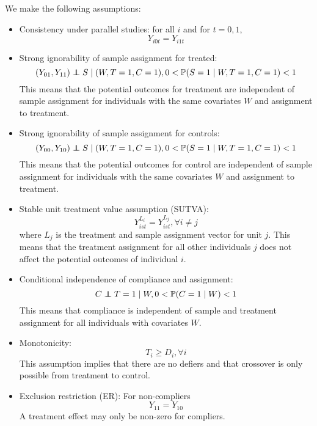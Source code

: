 \documentclass{article}
\newcommand{\pr}{\mathbb{P}} %
\newcommand\independent{\protect\mathpalette{\protect\independenT}{\perp}}
\def\independenT#1#2{\mathrel{\rlap{$#1#2$}\mkern2mu{#1#2}}}
\theoremstyle{plain}
\begin{document}
We make the following assumptions:
\begin{itemize}
\item{Consistency under parallel studies: for all $i$ and for $t=0, 1$,
\begin{equation}\label{consistency}
Y_{i0t} = Y_{i1t}
\end{equation}}
\item{Strong ignorability of sample assignment for treated:
\begin{equation}\label{si_treat}
(Y_{01}, Y_{11}) \independent S \mid (W, T=1,C = 1), 0 < \pr(S=1 \mid W, T=1,C = 1) <1 
\end{equation}}
This means that the potential outcomes for treatment are independent of sample assignment for individuals with the same covariates $W$ and assignment to treatment.
\item{Strong ignorability of sample assignment for controls:
\begin{equation}\label{si_ctrl}
(Y_{00}, Y_{10}) \independent S \mid (W, T=1,C = 1), 0 < \pr(S=1 \mid W, T=1,C = 1) <1 
\end{equation}}
This means that the potential outcomes for control are independent of sample assignment for individuals with the same covariates $W$ and assignment to treatment.
\item{Stable unit treatment value assumption (SUTVA):
\begin{equation}\label{sutva}
Y_{ist}^{L_i} = Y_{ist}^{L_j},  \forall i \neq j
\end{equation}
where $L_j$ is the treatment and sample assignment vector for unit $j$.  This means that the treatment assignment for all other individuals $j$ does not affect the potential outcomes of individual $i$.}
\item{Conditional independence of compliance and assignment:
\begin{equation}\label{compl}
C \independent T=1 \mid W, 0 < \pr(C = 1 \mid W) < 1
\end{equation}
This means that compliance is independent of sample and treatment assignment for all individuals with covariates $W$.
}
\item{Monotonicity: 
\begin{equation}\label{monotonicity}
T_i \geq D_i, \forall i
\end{equation}
This assumption implies that there are no defiers and that crossover is only possible from treatment to control.}
\item{Exclusion restriction (ER): For non-compliers
\begin{equation}\label{ER}
Y_{11} = Y_{10}
\end{equation}  
A treatment effect may only be non-zero for compliers.}
\end{itemize}
\end{document}
